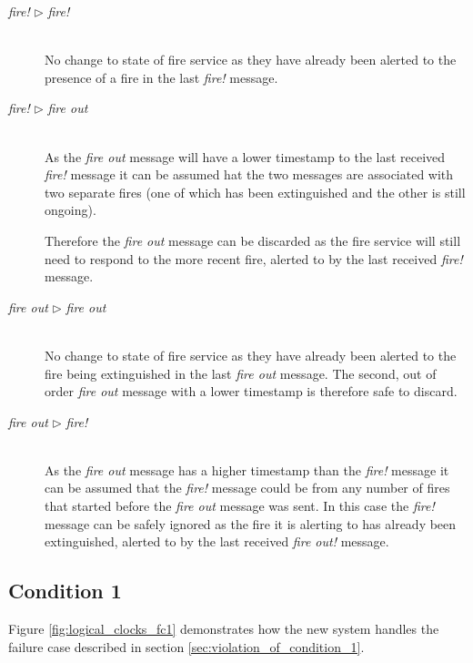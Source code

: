 \documentclass[twocolumn]{article}
\begin{document}
\begin{description}
  \item[\textit{fire!} $\rhd$ \textit{fire!}] \hfill \\
    No change to state of fire service as they have already been alerted to the
    presence of a fire in the last \textit{fire!} message.

  \item[\textit{fire!} $\rhd$ \textit{fire out}] \hfill \\
    As the \textit{fire out} message will have a lower timestamp to the last
    received \textit{fire!} message it can be assumed hat the two messages are
    associated with two separate fires (one of which has been extinguished and
    the other is still ongoing).

    Therefore the \textit{fire out} message can be discarded as the fire service
    will still need to respond to the more recent fire, alerted to by the last
    received \textit{fire!} message.

  \item[\textit{fire out} $\rhd$ \textit{fire out}] \hfill \\
    No change to state of fire service as they have already been alerted to the
    fire being extinguished in the last \textit{fire out} message.
    The second, out of order \textit{fire out} message with a lower timestamp
    is therefore safe to discard.

  \item[\textit{fire out} $\rhd$ \textit{fire!}] \hfill \\
    As the \textit{fire out} message has a higher timestamp than the
    \textit{fire!} message it can be assumed that the \textit{fire!} message
    could be from any number of fires that started before the \textit{fire out}
    message was sent.
    In this case the \textit{fire!} message can be safely ignored as the fire it
    is alerting to has already been extinguished, alerted to by the last
    received \textit{fire out!} message.
\end{description}

\subsection{Condition 1}

Figure \ref{fig:logical_clocks_fc1} demonstrates how the new system handles the
failure case described in section \ref{sec:violation_of_condition_1}.
\end{document}
